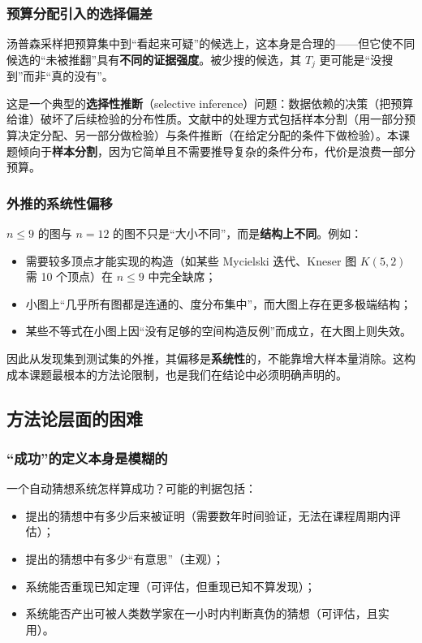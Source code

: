 \subsubsection{预算分配引入的选择偏差}

汤普森采样把预算集中到“看起来可疑”的候选上，这本身是合理的——但它使不同候选的“未被推翻”具有\textbf{不同的证据强度}。被少搜的候选，其 $T_j$ 更可能是“没搜到”而非“真的没有”。

这是一个典型的\textbf{选择性推断}（selective inference）问题：数据依赖的决策（把预算给谁）破坏了后续检验的分布性质。文献中的处理方式包括样本分割（用一部分预算决定分配、另一部分做检验）与条件推断（在给定分配的条件下做检验）。本课题倾向于\textbf{样本分割}，因为它简单且不需要推导复杂的条件分布，代价是浪费一部分预算。

\subsubsection{外推的系统性偏移}

$n\le 9$ 的图与 $n=12$ 的图不只是“大小不同”，而是\textbf{结构上不同}。例如：

\begin{itemize}
  \item 需要较多顶点才能实现的构造（如某些 Mycielski 迭代、Kneser 图 $K(5,2)$ 需 10 个顶点）在 $n\le 9$ 中完全缺席；
  \item 小图上“几乎所有图都是连通的、度分布集中”，而大图上存在更多极端结构；
  \item 某些不等式在小图上因“没有足够的空间构造反例”而成立，在大图上则失效。
\end{itemize}

因此从发现集到测试集的外推，其偏移是\textbf{系统性}的，不能靠增大样本量消除。这构成本课题最根本的方法论限制，也是我们在结论中必须明确声明的。

\subsection{方法论层面的困难}
\label{sec:hard-method}

\subsubsection{“成功”的定义本身是模糊的}

一个自动猜想系统怎样算成功？可能的判据包括：

\begin{itemize}
  \item 提出的猜想中有多少后来被证明（需要数年时间验证，无法在课程周期内评估）；
  \item 提出的猜想中有多少“有意思”（主观）；
  \item 系统能否重现已知定理（可评估，但重现已知不算发现）；
  \item 系统能否产出可被人类数学家在一小时内判断真伪的猜想（可评估，且实用）。
\end{itemize}

